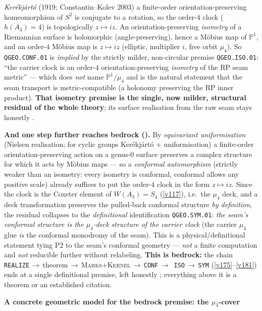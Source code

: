 \documentclass[11pt,a4paper]{article}
\newcommand{\PP}{\mathbb P^1}
\begin{document}
\begin{keybox}
\emph{Ker\'ekj\'art\'o} (1919; Constantin--Kolev 2003) a finite-order orientation-preserving
homeomorphism of $S^2$ is conjugate to a rotation, so the order-$4$ clock ($h(A_3){=}4$) is
topologically $z\mapsto iz$. An orientation-preserving \emph{isometry} of a Riemannian surface is
holomorphic (angle-preserving), hence a M\"obius map of $\PP$, and an order-$4$ M\"obius map is
$z\mapsto iz$ (elliptic, multiplier $i$, free orbit $\mu_4$). So \texttt{QGEO.CONF.01} is \emph{implied}
by the strictly milder, non-circular premise \texttt{QGEO.ISO.01}: ``the carrier clock is an order-$4$
orientation-preserving \emph{isometry} of the RP seam metric'' --- which does \emph{not} name
$\PP/\mu_4$ and is the natural statement that the seam transport is metric-compatible (a holonomy
preserving the RP inner product). \textbf{That isometry premise is the single, now milder, structural
residual of the whole theory}; its surface realisation from the raw seam stays honestly \mO.
\par\smallskip\noindent\textbf{And one step further reaches bedrock
().} By \emph{equivariant uniformisation} (Nielsen
realisation; for cyclic groups Ker\'ekj\'art\'o $+$ uniformisation) a finite-order orientation-preserving
action on a genus-$0$ surface preserves a complex structure for which it acts by M\"obius maps --- so a
\emph{conformal automorphism} (strictly weaker than an isometry: every isometry is conformal, conformal
allows any positive scale) already suffices to put the order-$4$ clock in the form $z\mapsto iz$. Since
the clock is the Coxeter element of $W(A_3)=S_4$ (\vref{v117}), i.e.\ the $\mu_4$ deck, and a deck
transformation preserves the pulled-back conformal structure \emph{by definition}, the residual
collapses to the \emph{definitional} identification \texttt{QGEO.SYM.01}: \emph{the seam's conformal
structure is the $\mu_4$-deck structure of the carrier clock} (the carrier $\mu_4$ glue \emph{is} the
conformal monodromy of the seam). This is a physical/definitional statement tying P2 to the seam's
conformal geometry --- \emph{not} a finite computation and \emph{not} reducible further without
relabeling. \textbf{This is bedrock:} the chain
\texttt{REALIZE}\,$\to$\,theorem\,$\to$\,\textsc{Marks{+}Kernel}\,$\to$\,\texttt{CONF}\,$\to$\,%
\texttt{ISO}\,$\to$\,\texttt{SYM} (\vref{v175}--\vref{v181}) ends at a single definitional premise, left
honestly \mO; everything above it is a theorem or an established citation.
\par\smallskip\noindent\textbf{A concrete geometric model for the bedrock premise: the $\mu_3$-cover
}
\end{keybox}
\end{document}
